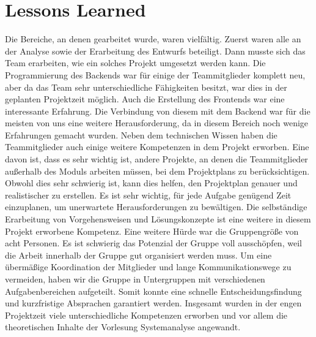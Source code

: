 	\section{Lessons Learned} \label{Ausblick}
	Die Bereiche, an denen gearbeitet wurde, waren vielfältig. Zuerst waren alle an der Analyse sowie der Erarbeitung des Entwurfs beteiligt. Dann musste sich das Team erarbeiten, wie ein solches Projekt umgesetzt werden kann. Die Programmierung des Backends war für einige der Teammitglieder komplett neu, aber da das Team sehr unterschiedliche Fähigkeiten besitzt, war dies in der geplanten Projektzeit möglich. Auch die Erstellung des Frontends war eine interessante Erfahrung. Die Verbindung von diesem mit dem Backend war für die meisten von uns eine weitere Herausforderung, da in diesem Bereich noch wenige Erfahrungen gemacht wurden. 
	Neben dem technischen Wissen haben die Teammitglieder auch einige weitere Kompetenzen in dem Projekt erworben. Eine davon ist, dass es sehr wichtig ist, andere Projekte, an denen die Teammitglieder außerhalb des Moduls arbeiten müssen, bei dem Projektplans zu berücksichtigen. Obwohl dies sehr schwierig ist, kann dies helfen, den Projektplan genauer und realistischer zu erstellen. Es ist sehr wichtig, für jede Aufgabe genügend Zeit einzuplanen, um unerwartete Herausforderungen zu bewältigen. Die selbständige Erarbeitung von Vorgehensweisen und Lösungskonzepte ist eine weitere in diesem Projekt erworbene Kompetenz.
	Eine weitere Hürde war die Gruppengröße von acht Personen. Es ist schwierig das Potenzial der Gruppe voll ausschöpfen, weil die Arbeit innerhalb der Gruppe gut organisiert werden muss.  Um eine übermäßige Koordination der Mitglieder und lange Kommunikationswege zu vermeiden, haben wir die Gruppe in Untergruppen mit verschiedenen Aufgabenbereichen aufgeteilt. Somit konnte eine schnelle Entscheidungsfindung und kurzfristige Absprachen garantiert werden. Insgesamt wurden in der engen Projektzeit viele unterschiedliche Kompetenzen erworben und vor allem die theoretischen Inhalte der Vorlesung Systemanalyse angewandt.
	
	
	
	
	